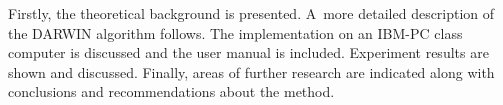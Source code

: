 Firstly, the theoretical background is presented. A~more detailed description
of the DARWIN algorithm follows. The implementation on an IBM-PC class
computer is discussed and the user manual is included. Experiment results are
shown and discussed. Finally, areas of further research are indicated along
with conclusions and recommendations about the method.
